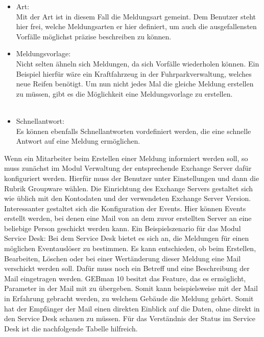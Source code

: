 \begin{itemize}[itemsep=10pt]
\item Art:\\
		Mit der Art ist in diesem Fall die Meldungsart gemeint. Dem Benutzer steht hier frei, welche 
		Meldungsarten er hier definiert, um auch die ausgefallensten Vorfälle möglichst präzise beschreiben zu 
		können.  \\
		 
\item Meldungsvorlage:\\
		Nicht selten ähneln sich Meldungen, da sich Vorfälle wiederholen können. Ein Beispiel hierfür wäre ein 
		Kraftfahrzeug in der Fuhrparkverwaltung, welches neue Reifen benötigt. Um nun nicht jedes Mal die 
		gleiche Meldung erstellen zu müssen, gibt es die Möglichkeit eine Meldungsvorlage zu erstellen. \\\\
		
\item Schnellantwort:\\
		Es können ebenfalls Schnellantworten vordefiniert werden, die eine schnelle Antwort auf eine Meldung 
		ermöglichen.\\		
\end{itemize}

\noindent
Wenn ein Mitarbeiter beim Erstellen einer Meldung informiert werden soll, so muss zunächst im Modul Verwaltung der entsprechende Exchange Server dafür konfiguriert werden. Hierfür muss der Benutzer unter Einstellungen und dann die Rubrik Groupware wählen. Die Einrichtung des Exchange Servers gestaltet sich wie üblich mit den Kontodaten und der verwendeten Exchange Server Version.\newline
Interessanter gestaltet sich die Konfiguration der Events. Hier können Events erstellt werden, bei denen eine Mail von an dem zuvor erstellten Server an eine beliebige Person geschickt werden kann. Ein Beispielszenario für das Modul Service Desk:\newline
Bei dem Service Desk bietet es sich an, die Meldungen für einen möglichen Eventauslöser zu bestimmen. Es kann entschieden, ob beim Erstellen, Bearbeiten, Löschen oder bei einer Wertänderung dieser Meldung eine Mail verschickt werden soll. Dafür muss noch ein Betreff und eine Beschreibung der Mail eingetragen werden. GEBman 10 besitzt das Feature, das es ermöglicht, Parameter in der Mail mit zu übergeben. Somit kann beispielsweise mit der Mail in Erfahrung gebracht werden, zu welchem Gebäude die Meldung gehört. Somit hat der Empfänger der Mail einen direkten Einblick auf die Daten, ohne direkt in den Service Desk schauen zu müssen.\newline
Für das Verständnis der Status im Service Desk ist die nachfolgende Tabelle hilfreich.\\

